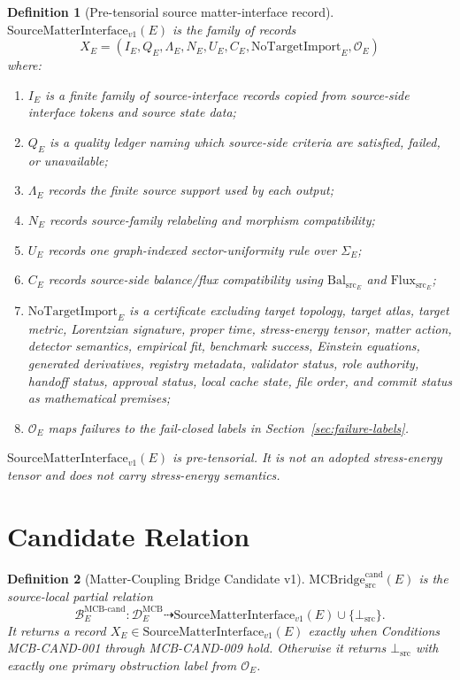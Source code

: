 \documentclass[11pt]{article}
\newcommand{\MCBridgeCand}{\mathrm{MCBridge}_{\mathrm{src}}^{\mathrm{cand}}}
\newcommand{\SMI}{\mathrm{SourceMatterInterface}_{v1}}
\newcommand{\NoTargetImport}{\mathrm{NoTargetImport}}
\newcommand{\BalSrc}{\mathrm{Bal}_{\mathrm{src}}}
\newcommand{\FluxSrc}{\mathrm{Flux}_{\mathrm{src}}}
\newcommand{\BottomSrc}{\bot_{\mathrm{src}}}
\newtheorem{definition}{Definition}
\begin{document}
\begin{definition}[Pre-tensorial source matter-interface record]
\(\SMI(E)\) is the family of records
\[
  X_E =
  (I_E,Q_E,\Lambda_E,N_E,U_E,C_E,\NoTargetImport_E,\mathcal{O}_E)
\]
where:
\begin{enumerate}[label=(\alph*)]
  \item \(I_E\) is a finite family of source-interface records copied from
  source-side interface tokens and source state data;
  \item \(Q_E\) is a quality ledger naming which source-side criteria are
  satisfied, failed, or unavailable;
  \item \(\Lambda_E\) records the finite source support used by each output;
  \item \(N_E\) records source-family relabeling and morphism compatibility;
  \item \(U_E\) records one graph-indexed sector-uniformity rule over
  \(\Sigma_E\);
  \item \(C_E\) records source-side balance/flux compatibility using
  \(\BalSrc_E\) and \(\FluxSrc_E\);
  \item \(\NoTargetImport_E\) is a certificate excluding target topology,
  target atlas, target metric, Lorentzian signature, proper time,
  stress-energy tensor, matter action, detector semantics, empirical fit,
  benchmark success, Einstein equations, generated derivatives, registry
  metadata, validator status, role authority, handoff status, approval status,
  local cache state, file order, and commit status as mathematical premises;
  \item \(\mathcal{O}_E\) maps failures to the fail-closed labels in
  Section~\ref{sec:failure-labels}.
\end{enumerate}
\(\SMI(E)\) is pre-tensorial. It is not an adopted stress-energy tensor and
does not carry stress-energy semantics.
\end{definition}

\section{Candidate Relation}

\begin{definition}[Matter-Coupling Bridge Candidate v1]
\(\MCBridgeCand(E)\) is the source-local partial relation
\[
  \mathcal{B}^{\mathrm{MCB\text{-}cand}}_E:
  \mathcal{D}^{\mathrm{MCB}}_E
  \dashrightarrow
  \SMI(E) \cup \{\BottomSrc\}.
\]
It returns a record \(X_E\in\SMI(E)\) exactly when Conditions
MCB-CAND-001 through MCB-CAND-009 hold. Otherwise it returns
\(\BottomSrc\) with exactly one primary obstruction label from
\(\mathcal{O}_E\).
\end{definition}
\end{document}
